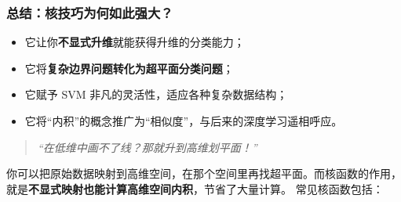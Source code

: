 \subsubsection{总结：核技巧为何如此强大？}


\begin{itemize}
    \item 它让你\textbf{不显式升维}就能获得升维的分类能力；
    \item 它将\textbf{复杂边界问题转化为超平面分类问题}；
    \item 它赋予 SVM 非凡的灵活性，适应各种复杂数据结构；
    \item 它将“内积”的概念推广为“相似度”，与后来的深度学习遥相呼应。
\end{itemize}
\begin{quote}
\itshape
“在低维中画不了线？那就升到高维划平面！”
\end{quote}
你可以把原始数据映射到高维空间，在那个空间里再找超平面。而核函数的作用，就是{\bf 不显式映射也能计算高维空间内积}，节省了大量计算。
常见核函数包括：

